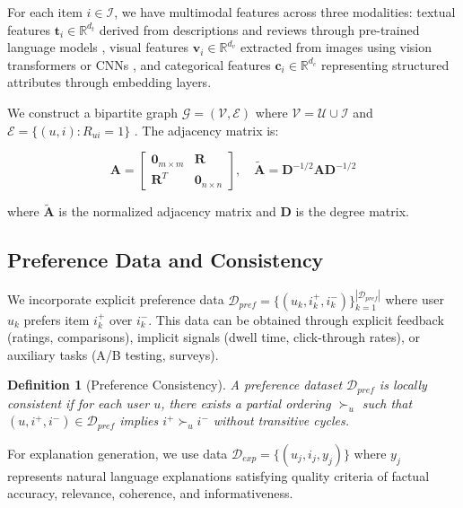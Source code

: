 \documentclass[pdflatex,sn-mathphys-num]{sn-jnl}%
\theoremstyle{thmstyleone}%
\theoremstyle{thmstyletwo}%
\theoremstyle{thmstylethree}%
\newtheorem{definition}{Definition}%
\begin{document}
For each item $i \in \mathcal{I}$, we have multimodal features across three modalities: textual features $\mathbf{t}_i \in \mathbb{R}^{d_t}$ derived from descriptions and reviews through pre-trained language models \cite{devlin2018bert}, visual features $\mathbf{v}_i \in \mathbb{R}^{d_v}$ extracted from images using vision transformers \cite{dosovitskiy2020image} or CNNs \cite{krizhevsky2012imagenet}, and categorical features $\mathbf{c}_i \in \mathbb{R}^{d_c}$ representing structured attributes through embedding layers.

We construct a bipartite graph $\mathcal{G} = (\mathcal{V}, \mathcal{E})$ where $\mathcal{V} = \mathcal{U} \cup \mathcal{I}$ and $\mathcal{E} = \{(u,i) : R_{ui} = 1\}$ \cite{kipf2016semi}. The adjacency matrix is:

\begin{equation}
\mathbf{A} = \begin{bmatrix}
\mathbf{0}_{m \times m} & \mathbf{R} \\
\mathbf{R}^T & \mathbf{0}_{n \times n}
\end{bmatrix}, \quad \tilde{\mathbf{A}} = \mathbf{D}^{-1/2}\mathbf{A}\mathbf{D}^{-1/2}
\end{equation}

where $\tilde{\mathbf{A}}$ is the normalized adjacency matrix and $\mathbf{D}$ is the degree matrix.

\subsection{Preference Data and Consistency}

We incorporate explicit preference data $\mathcal{D}_{pref} = \{(u_k, i_k^+, i_k^-)\}_{k=1}^{|\mathcal{D}_{pref}|}$ where user $u_k$ prefers item $i_k^+$ over $i_k^-$. This data can be obtained through explicit feedback (ratings, comparisons), implicit signals (dwell time, click-through rates), or auxiliary tasks (A/B testing, surveys).

\begin{definition}[Preference Consistency]
A preference dataset $\mathcal{D}_{pref}$ is \emph{locally consistent} if for each user $u$, there exists a partial ordering $\succ_u$ such that $(u, i^+, i^-) \in \mathcal{D}_{pref}$ implies $i^+ \succ_u i^-$ without transitive cycles.
\end{definition}

For explanation generation, we use data $\mathcal{D}_{exp} = \{(u_j, i_j, y_j)\}$ where $y_j$ represents natural language explanations satisfying quality criteria of factual accuracy, relevance, coherence, and informativeness.
\end{document}
